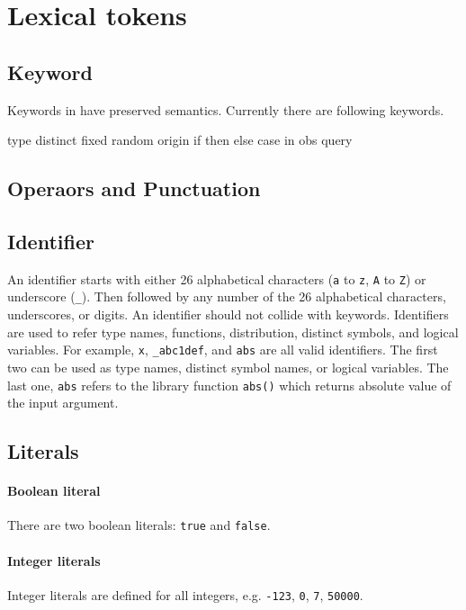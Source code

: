 \documentclass[12pt]{article}
\begin{document}
\section{Lexical tokens}
\subsection{Keyword} \label{keyword-section}
Keywords in \bl have preserved semantics. Currently there are following keywords. 
\begin{blogcode}
  type    distinct    fixed    random    origin
  if      then        else     case      in
  obs     query
\end{blogcode}

\subsection{Operaors and Punctuation}


\subsection{Identifier}\label{identifier-section}
An identifier starts with either 26 alphabetical characters (\verb|a| to \verb|z|, \verb|A| to \verb|Z|) or underscore (\verb|_|). Then followed by any number of the 26 alphabetical characters, underscores, or digits. 
An identifier should not collide with keywords. 
Identifiers are used to refer type names, functions, distribution, distinct symbols, and logical variables. 
For example, \verb|x|, \verb|_abc1def|, and \verb|abs| are all valid identifiers. 
The first two can be used as type names, distinct symbol names, or logical variables. 
The last one, \verb|abs| refers to the library function \verb|abs()| which returns absolute value of the input argument.

\subsection{Literals}
\paragraph{Boolean literal}
There are two boolean literals: \verb|true| and \verb|false|.

\paragraph{Integer literals}
Integer literals are defined for all integers, e.g. \verb|-123|, \verb|0|,
\verb|7|, \verb|50000|.
\end{document}
